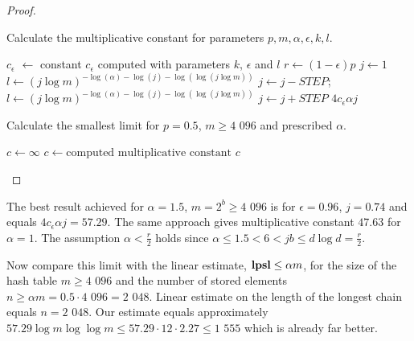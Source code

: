 \begin{proof}
\begin{algorithm}[ht!]
\caption{Calculate the multiplicative constant for parameters $p, m, \alpha, \epsilon, k, l$.}
\label{procedure-scheme-3}
\begin{algorithmic}
\STATE $c_\epsilon$ $\leftarrow$ constant $c_\epsilon$ computed with parameters $k$, $\epsilon$ and $l$
\STATE $r \leftarrow (1 - \epsilon)p$ 
\STATE $j \leftarrow 1$
\STATE 
\STATE {}
\STATE $l \leftarrow (j \log m) ^ {-\log(\alpha) - \log(j) - \log(\log(j \log m))}$
	\STATE $j \leftarrow j - STEP$;
	\STATE $l \leftarrow (j \log m) ^ {-\log(\alpha) - \log(j) - \log(\log(j \log m))}$
\ENDWHILE
\STATE
\STATE $j \leftarrow j + STEP$
\RETURN $4 c_\epsilon \alpha j$
\end{algorithmic}
\end{algorithm}

\begin{algorithm}[ht!]
\caption{Calculate the smallest limit for $p=0.5$, $m \geq \text{4 096}$ and prescribed $\alpha$.}
\label{algorithm-scheme-3}
\begin{algorithmic}
\STATE $c \leftarrow \infty$
				\STATE $c \leftarrow \text{computed multiplicative constant}$
			\ENDIF
		\ENDFOR
	\ENDFOR
\ENDFOR
\STATE
\RETURN $c$
\end{algorithmic}
\end{algorithm}
\end{proof}

The best result achieved for $\alpha = 1.5$, $m = 2 ^ b \geq \text{4 096}$ is for $\epsilon = 0.96$, $j = 0.74$ and equals $4 c_\epsilon \alpha j = 57.29$. The same approach gives multiplicative constant $47.63$ for $\alpha = 1$. The assumption $\alpha < \frac{r}{2}$ holds since $\alpha \leq 1.5 < 6 < jb \leq d \log d = \frac{r}{2}$.

Now compare this limit with the linear estimate, $\mathbf{lpsl} \leq \alpha m$, for the size of the hash table $m \geq \text{4 096}$ and the number of stored elements $n \geq \alpha m = 0.5 \cdot \text{4 096} = \text{2 048}$. Linear estimate on the length of the longest chain equals $n = \text{2 048}$. Our estimate equals approximately $57.29 \log m \log \log m \leq 57.29 \cdot 12 \cdot 2.27 \leq \text{1 555}$ which is already far better. 

